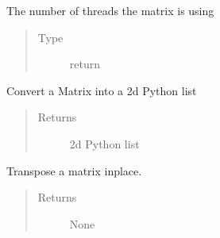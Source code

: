 \documentclass[letterpaper,10pt,english]{sphinxmanual}
\begin{document}
\begin{fulllineitems}
\begin{fulllineitems}
\label{\detokenize{libpymath.matrix:libpymath.matrix.matrix.Matrix.sum}}
\end{fulllineitems}


\begin{fulllineitems}
\label{\detokenize{libpymath.matrix:libpymath.matrix.matrix.Matrix.threads}}
The number of threads the matrix is using
\begin{quote}\begin{description}
\item[{Type}] \leavevmode
return

\end{description}\end{quote}

\end{fulllineitems}


\begin{fulllineitems}
\label{\detokenize{libpymath.matrix:libpymath.matrix.matrix.Matrix.toList}}
Convert a Matrix into a 2d Python list
\begin{quote}\begin{description}
\item[{Returns}] \leavevmode
2d Python list

\end{description}\end{quote}

\end{fulllineitems}


\begin{fulllineitems}
\label{\detokenize{libpymath.matrix:libpymath.matrix.matrix.Matrix.transpose}}
Transpose a matrix inplace.
\begin{quote}\begin{description}
\item[{Returns}] \leavevmode
None


\end{description}
\end{quote}
\end{fulllineitems}
\end{fulllineitems}
\end{document}
